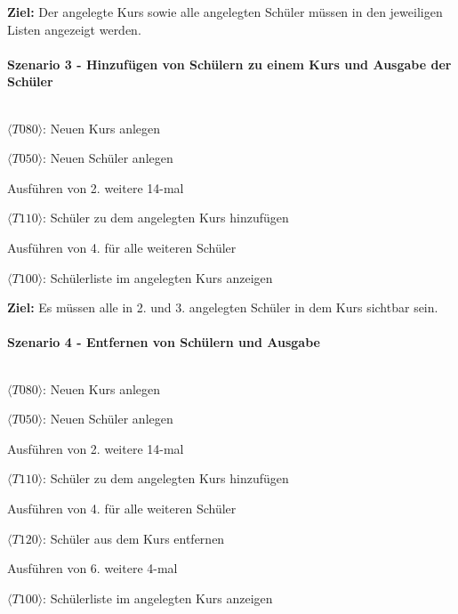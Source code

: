         \textbf{\sffamily Ziel:} Der angelegte Kurs sowie alle angelegten Schüler müssen in den jeweiligen Listen angezeigt werden.
    
    \paragraph{Szenario 3 - Hinzufügen von Schülern zu einem Kurs und Ausgabe der Schüler} $~$ 
        
        
        \begin{test3}
            \item $\langle T080 \rangle$: Neuen Kurs anlegen
            \item $\langle T050 \rangle$: Neuen Schüler anlegen
            \item Ausführen von 2. weitere 14-mal
            \item $\langle T110 \rangle$: Schüler zu dem angelegten Kurs hinzufügen
            \item Ausführen von 4. für alle weiteren Schüler
            \item $\langle T100 \rangle$: Schülerliste im angelegten Kurs anzeigen
        \end{test3}
        
        \textbf{\sffamily Ziel:} Es müssen alle in 2. und 3. angelegten Schüler in dem Kurs sichtbar sein.
        
        \newpage
        
    \paragraph{Szenario 4 - Entfernen von Schülern und Ausgabe} $~$ 
        
        
        \begin{test4}
            \item $\langle T080 \rangle$: Neuen Kurs anlegen
            \item $\langle T050 \rangle$: Neuen Schüler anlegen
            \item Ausführen von 2. weitere 14-mal
            \item $\langle T110 \rangle$: Schüler zu dem angelegten Kurs hinzufügen
            \item Ausführen von 4. für alle weiteren Schüler
            \item $\langle T120 \rangle$: Schüler aus dem Kurs entfernen
            \item Ausführen von 6. weitere 4-mal
            \item $\langle T100 \rangle$: Schülerliste im angelegten Kurs anzeigen
        \end{test4}
        

